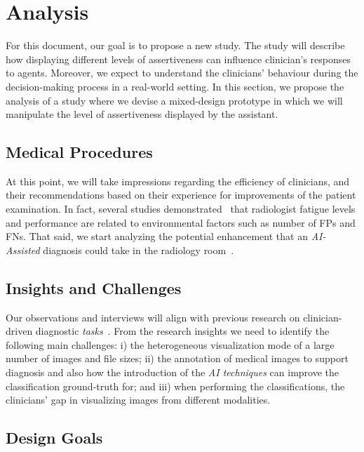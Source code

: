 \section{Analysis}
\label{sec:sec003}

For this document, our goal is to propose a new study.
The study will describe how displaying different levels of assertiveness can influence clinician's responses to agents.
Moreover, we expect to understand the clinicians' behaviour during the decision-making process in a real-world setting.
In this section, we propose the analysis of a study where we devise a mixed-design prototype in which we will manipulate the level of assertiveness displayed by the assistant.

\subsection{Medical Procedures}
\label{sec:sec00301}

At this point, we will take impressions regarding the efficiency of clinicians, and their recommendations based on their experience for improvements of the patient examination.
In fact, several studies demonstrated~\cite{waite2017tired} that radiologist fatigue levels and performance are related to environmental factors such as number of FPs and FNs.
That said, we start analyzing the potential enhancement that an {\it AI-Assisted} diagnosis could take in the radiology room~\cite{chatelain2018evaluation, miglioretti2007radiologist}.

\subsection{Insights and Challenges}
\label{sec:sec00302}

Our observations and interviews will align with previous research on clinician-driven diagnostic {\it tasks}~\cite{Sultanum:2018:MTP:3173574.3173996}.
From the research insights we need to identify the following main challenges:
i) the heterogeneous visualization mode of a large number of images and file sizes;
ii) the annotation of medical images to support diagnosis and also 
how the introduction of the {\it AI techniques} can improve the classification ground-truth for; and
iii) when performing the classifications, the clinicians' gap in visualizing images from different modalities.

\subsection{Design Goals}
\label{sec:sec00303}

